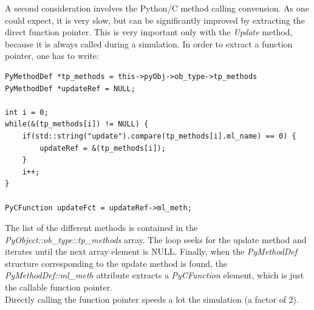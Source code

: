 \documentclass{article}
\begin{document}
A second consideration involves the Python/C method calling convension. As one could expect, it is very slow, but can be significantly improved by extracting the direct function pointer. This is very important only with the \emph{Update} method, because it is always called during a simulation.
In order to extract a function pointer, one has to write:
\begin{verbatim}
PyMethodDef *tp_methods = this->pyObj->ob_type->tp_methods
PyMethodDef *updateRef = NULL;

int i = 0;
while(&(tp_methods[i]) != NULL) {
    if(std::string("update").compare(tp_methods[i].ml_name) == 0) {
        updateRef = &(tp_methods[i]);
    }
    i++;
}

PyCFunction updateFct = updateRef->ml_meth;
\end{verbatim}
The list of the different methods is contained in the \emph{PyObject::ob\_type::tp\_methods} array. The loop seeks for the update method and iterates until the next array element is NULL. Finally, when the \emph{PyMethodDef} structure corresponding to the update method is found, the \emph{PyMethodDef::ml\_meth} attribute extracts a \emph{PyCFunction} element, which is just the callable function pointer.\\
Directly calling the function pointer speeds a lot the simulation (a factor of 2).
\end{document}

